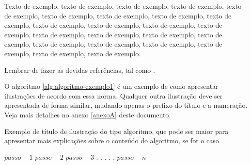 \documentclass[
	12pt,				%
	oneside,			%
	a4paper,			%
	english,			%
	brazil				%
	]{abntex2ppgsi}
\begin{document}
Texto de exemplo, texto de exemplo, texto de exemplo, texto de exemplo, texto de exemplo, texto de exemplo, texto de exemplo, texto de exemplo, texto de exemplo, texto de exemplo, texto de exemplo, texto de exemplo, texto de exemplo, texto de exemplo, texto de exemplo, texto de exemplo, texto de exemplo, texto de exemplo, texto de exemplo, texto de exemplo, texto de exemplo, texto de exemplo, texto de exemplo.

Lembrar de fazer as devidas  referências, tal como \cite{teste1, teste2, teste3}.

O algoritmo \ref{alg:algoritmo-exemplo1} é um exemplo de como apresentar ilustrações de acordo com essa norma. Qualquer outra ilustração deve ser apresentada de forma similar, mudando apenas o prefixo do título e a numeração. Veja mais detalhes no anexo \ref{anexoA} deste documento.

% 
%
%
%
%
\begin{algorithm}[htbp]
\caption{Exemplo de título de ilustração do tipo algoritmo, que pode ser maior para apresentar mais explicações sobre o conteúdo do algoritmo, se for o caso}
\label{alg:algoritmo-exemplo1}
\begin{algorithmic}[1]
\State $passo-1$
\State $passo-2$
\State $passo-3$
\State $.$
\State $.$
\State $.$
\State $.$
\State $.$
\State $passo-n$
\EndProcedure
\end{algorithmic}
\end{algorithm}
\end{document}
